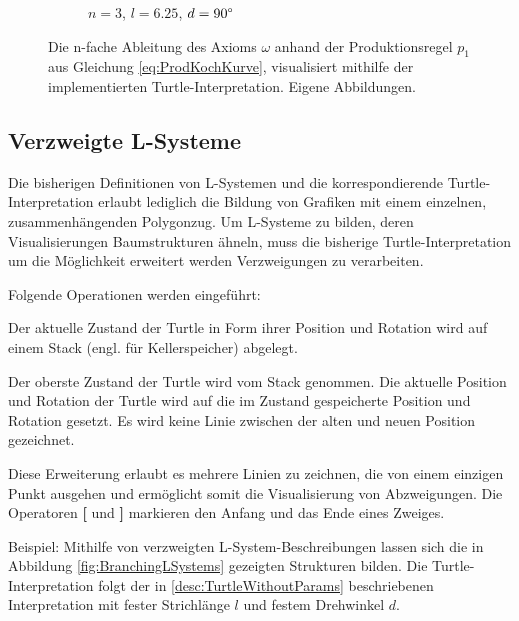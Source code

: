 \begin{figure} [hbtp]
\begin{subfigure}[t]{.4\textwidth}
		\caption{$n=3$, $l=6.25$, $d=90\degree$}
		\label{fig:KochkurveN3L6_25}
	\end{subfigure}
	\caption{Die n-fache Ableitung des Axioms $\omega$ anhand der Produktionsregel $p_1$ aus Gleichung \ref{eq:ProdKochKurve}, visualisiert mithilfe der implementierten Turtle-Interpretation. Eigene Abbildungen.}
	\label{fig:KochkurveAbleitung}
\end{figure}

\subsection{Verzweigte L-Systeme} \label{subsec:BranchingLSystems}

Die bisherigen Definitionen von L-Systemen und die korrespondierende Turtle-Interpretation erlaubt lediglich die Bildung von Grafiken mit einem einzelnen, zusammenhängenden Polygonzug. Um L-Systeme zu bilden, deren Visualisierungen Baumstrukturen ähneln, muss die bisherige Turtle-Interpretation um die Möglichkeit erweitert werden Verzweigungen zu verarbeiten. \cite[S.24]{ABOP:04} 

Folgende Operationen werden eingeführt:

\begin{description}[labelindent]
	\item[\textbf{[}] Der aktuelle Zustand der Turtle in Form ihrer Position und Ro\-ta\-tion wird auf einem Stack (engl. für Kellerspeicher) abgelegt. \\
	
	\item[\textbf{]}] Der oberste Zustand der Turtle wird vom Stack genommen. Die aktuelle Position und Rotation der Turtle wird auf die im Zustand gespeicherte Position und Rotation gesetzt. Es wird keine Linie zwischen der alten und neuen Position gezeichnet. 
\end{description}

\cite[S.24]{ABOP:04}

Diese Erweiterung erlaubt es mehrere Linien zu zeichnen, die von einem einzigen Punkt ausgehen und ermöglicht somit die Visualisierung von Abzweigungen. Die Operatoren \textbf{[} und \textbf{]} markieren den Anfang und das Ende eines Zweiges. \cite[S.24]{ABOP:04} 

Beispiel: Mithilfe von verzweigten L-System-Beschreibungen lassen sich die in Abbildung \ref{fig:BranchingLSystems} gezeigten Strukturen bilden. Die Turtle-Interpretation folgt der in \ref{desc:TurtleWithoutParams} beschriebenen Interpretation mit fester Strichlänge $l$ und festem Drehwinkel $d$.

